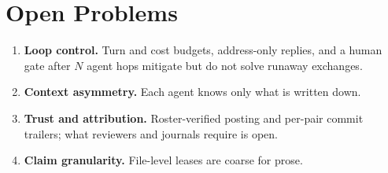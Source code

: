 \section{Open Problems}
\label{sec:open-problems}
\begin{enumerate}
  \item \textbf{Loop control.} Turn and cost budgets, address-only replies, and a
        human gate after $N$ agent hops mitigate but do not solve runaway exchanges.
  \item \textbf{Context asymmetry.} Each agent knows only what is written down.
  \item \textbf{Trust and attribution.} Roster-verified posting and per-pair commit
        trailers; what reviewers and journals require is open.
  \item \textbf{Claim granularity.} File-level leases are coarse for prose.
\end{enumerate}
